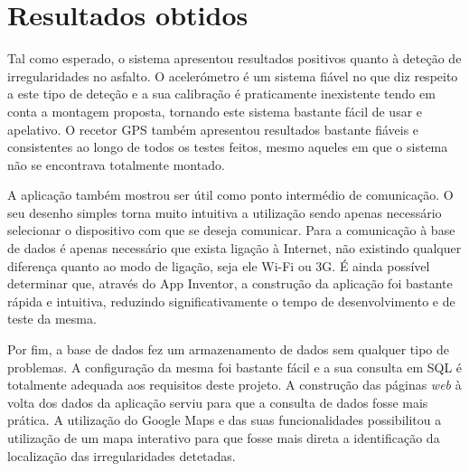 \section{Resultados obtidos}
\label{sec:resultados}

Tal como esperado, o sistema apresentou resultados positivos quanto à deteção de irregularidades no asfalto.
O acelerómetro é um sistema fiável no que diz respeito a este tipo de deteção e a sua calibração é praticamente inexistente tendo em conta a montagem proposta, tornando este sistema bastante fácil de usar e apelativo.
O recetor GPS também apresentou resultados bastante fiáveis e consistentes ao longo de todos os testes feitos, mesmo aqueles em que o sistema não se encontrava totalmente montado.

A aplicação também mostrou ser útil como ponto intermédio de comunicação.
O seu desenho simples torna muito intuitiva a utilização sendo apenas necessário selecionar o dispositivo com que se deseja comunicar.
Para a comunicação à base de dados é apenas necessário que exista ligação à Internet, não existindo qualquer diferença quanto ao modo de ligação, seja ele Wi-Fi ou 3G.
É ainda possível determinar que, através do App Inventor, a construção da aplicação foi bastante rápida e intuitiva, reduzindo significativamente o tempo de desenvolvimento e de teste da mesma.

Por fim, a base de dados fez um armazenamento de dados sem qualquer tipo de problemas.
A configuração da mesma foi bastante fácil e a sua consulta em SQL é totalmente adequada aos requisitos deste projeto.
A construção das páginas \emph{web} à volta dos dados da aplicação serviu para que a consulta de dados fosse mais prática.
A utilização do Google Maps e das suas funcionalidades possibilitou a utilização de um mapa interativo para que fosse mais direta a identificação da localização das irregularidades detetadas.